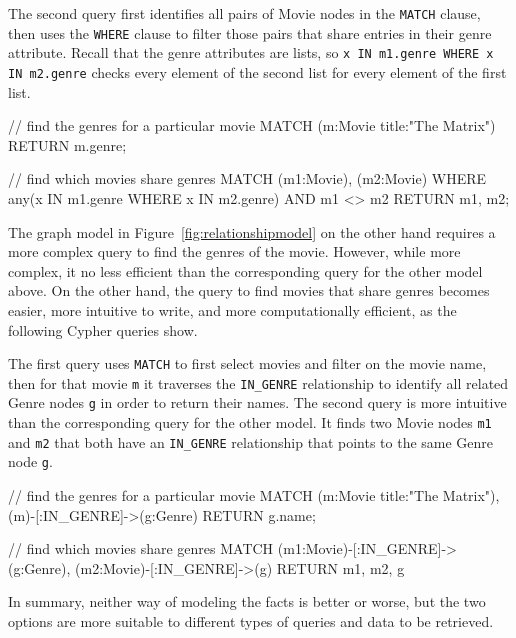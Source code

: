 The second query first identifies all pairs of Movie nodes in the \texttt{MATCH} clause, then uses the \texttt{WHERE} clause to filter those pairs that share entries in their genre attribute. Recall that the genre attributes are lists, so \texttt{x IN m1.genre WHERE x IN m2.genre} checks every element of the second list for every element of the first list. 

\begin{samepage}
\begin{cyphercode}
// find the genres for a particular movie
MATCH (m:Movie {title:"The Matrix"})
RETURN m.genre;

// find which movies share genres
MATCH (m1:Movie), (m2:Movie)
WHERE any(x IN m1.genre 
          WHERE x IN m2.genre)
AND m1 <> m2
RETURN m1, m2;
\end{cyphercode}
\end{samepage}

The graph model in Figure~\ref{fig:relationshipmodel} on the other hand requires a more complex query to find the genres of the movie. However, while more complex, it no less efficient than the corresponding query for the other model above. On the other hand, the query to find movies that share genres becomes easier, more intuitive to write, and more computationally efficient, as the following Cypher queries show.

The first query uses \texttt{MATCH} to first select movies and filter on the movie name, then for that movie \texttt{m} it traverses the \texttt{IN\_GENRE} relationship to identify all related Genre nodes \texttt{g} in order to return their names. The second query is more intuitive than the corresponding query for the other model. It finds two Movie nodes \texttt{m1} and \texttt{m2} that both have an \texttt{IN\_GENRE} relationship that points to the same Genre node \texttt{g}. 

\begin{samepage}
\begin{cyphercode}
// find the genres for a particular movie
MATCH (m:Movie {title:"The Matrix"}),
      (m)-[:IN_GENRE]->(g:Genre)
RETURN g.name;

// find which movies share genres
MATCH (m1:Movie)-[:IN_GENRE]->(g:Genre),
      (m2:Movie)-[:IN_GENRE]->(g)
RETURN m1, m2, g
\end{cyphercode}
\end{samepage}

In summary, neither way of modeling the facts is better or worse, but the two options are more suitable to different types of queries and data to be retrieved.

